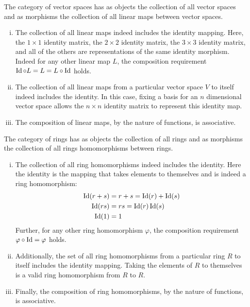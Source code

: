 \documentclass[../sean_thesis.tex]{subfiles}
\begin{document}
\begin{example}
	The category of vector spaces has as objects the collection of all vector spaces and as morphisms the collection of all linear maps between vector spaces.
	\vspace{-\varparskip}
	\begin{enumerate}[(i)]
		\item The collection of all linear maps indeed includes the identity mapping. Here, the $1\times 1$ identity matrix, the $2 \times 2$ identity matrix, the $3 \times 3$ identity matrix, and all of the others are representations of the same identity morphism. Indeed for any other linear map $L$, the composition requirement $\operatorname{Id} \circ L = L = L \circ \operatorname{Id}$ holds.
		\item The collection of all linear maps from a particular vector space $V$ to itself indeed includes the identity. In this case, fixing a basis for an $n$ dimensional vector space allows the $n\times n$ identity matrix to represent this identity map.
		\item The composition of linear maps, by the nature of functions, is associative.
	\end{enumerate}
\end{example}

\begin{example}
	The category of rings has as objects the collection of all  rings and as morphisms the collection of all rings homomorphisms between rings.
	\vspace{-\varparskip}
	\begin{enumerate}[(i)]
		\item The collection of all ring homomorphisms indeed includes the identity. Here the identity is the mapping that takes elements to themselves and is indeed a ring homomorphism:
		\begin{align*}
			\operatorname{Id}(r+s) &= r+s = \operatorname{Id}(r)+\operatorname{Id}(s)\\
			\operatorname{Id}(rs) &= rs = \operatorname{Id}(r)\operatorname{Id}(s)\\
			\operatorname{Id}(1) &= 1
		\end{align*}
		Further, for any other ring homomorphism $\varphi$, the composition requirement $\varphi \circ \operatorname{Id} = \varphi$ holds.
		\item Additionally, the set of all ring homomorphisms from a particular ring $R$ to itself includes the identity mapping. Taking the elements of $R$ to themselves is a valid ring homomorphism from $R$ to $R$.
		\item Finally, the composition of ring homomorphisms, by the nature of functions, is associative.
	\end{enumerate}
\end{example}
\end{document}
